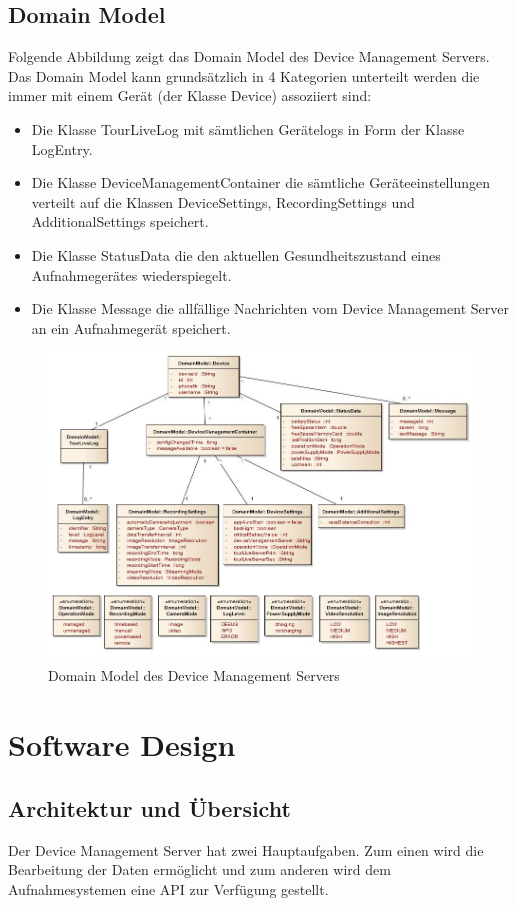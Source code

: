 \subsection{Domain Model}
Folgende Abbildung zeigt das Domain Model des Device Management Servers. Das Domain Model kann grundsätzlich in 4 Kategorien unterteilt werden die immer mit einem Gerät (der Klasse Device) assoziiert sind:


\begin{itemize}
\item Die Klasse TourLiveLog mit sämtlichen Gerätelogs in Form der Klasse LogEntry. 
\item Die Klasse DeviceManagementContainer die sämtliche Geräteeinstellungen verteilt auf die Klassen DeviceSettings, RecordingSettings und AdditionalSettings speichert.
\item Die Klasse StatusData die den aktuellen Gesundheitszustand eines Aufnahmegerätes wiederspiegelt.
\item Die Klasse Message die allfällige Nachrichten vom Device Management Server an ein Aufnahmegerät speichert.
\end{itemize}

\begin{figure}[H]
	\centering
	\includegraphics[width=120mm]{images/devmgmtsrv/domainmodel.jpg}
	\caption{Domain Model des Device Management Servers}
\end{figure}


\section{Software Design}
\subsection{Architektur und Übersicht}
Der Device Management Server hat zwei Hauptaufgaben. Zum einen wird die Bearbeitung der Daten ermöglicht und zum anderen wird dem Aufnahmesystemen eine API zur Verfügung gestellt.


